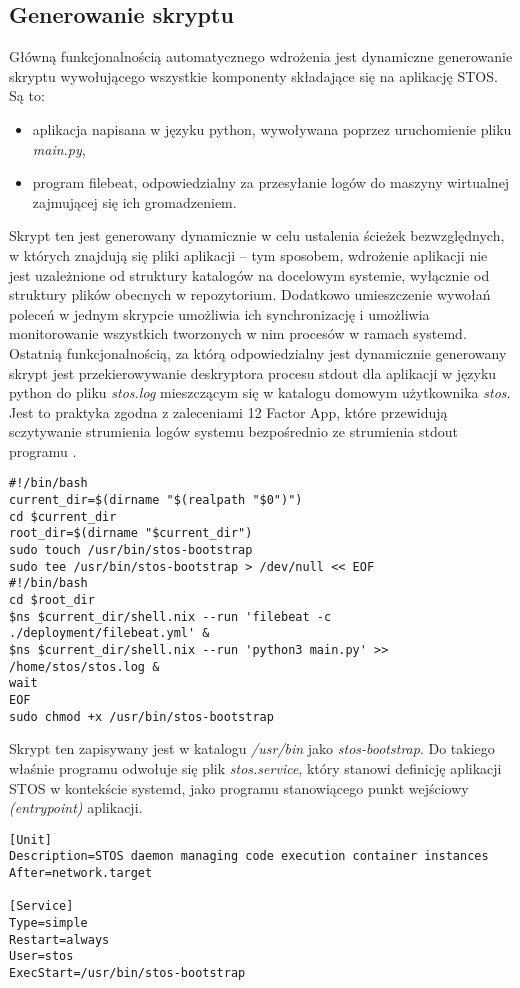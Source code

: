 \subsection{Generowanie skryptu}
Główną funkcjonalnością automatycznego wdrożenia jest dynamiczne generowanie skryptu wywołującego wszystkie komponenty składające się na aplikację STOS. Są to:
\begin{itemize}
	\item aplikacja napisana w języku python, wywoływana poprzez uruchomienie pliku \textit{main.py},
	\item program filebeat, odpowiedzialny za przesyłanie logów do maszyny wirtualnej zajmującej się ich gromadzeniem.
\end{itemize}
Skrypt ten jest generowany dynamicznie w celu ustalenia ścieżek bezwzględnych, w których znajdują się pliki aplikacji -- tym sposobem, wdrożenie aplikacji nie jest uzależnione od struktury katalogów na docelowym systemie, wyłącznie od struktury plików obecnych w repozytorium. Dodatkowo umieszczenie wywołań poleceń w jednym skrypcie umożliwia ich synchronizację i umożliwia monitorowanie wszystkich tworzonych w nim procesów w ramach systemd. Ostatnią funkcjonalnością, za którą odpowiedzialny jest dynamicznie generowany skrypt jest przekierowywanie deskryptora procesu stdout dla aplikacji w języku python do pliku \textit{stos.log} mieszczącym się w katalogu domowym użytkownika \textit{stos}. Jest to praktyka zgodna z zaleceniami 12 Factor App, które przewidują sczytywanie strumienia logów systemu bezpośrednio ze strumienia stdout programu \cite{12fa}.
\lstset{style=shell}
\begin{lstlisting}[caption = {Dynamiczne generowanie skryptu uruchamiającego aplikację STOS, uwzględniającego ścieżki bezwzlędne, w których znajdują się pliki źródłowe aplikacji}]
#!/bin/bash
current_dir=$(dirname "$(realpath "$0")")
cd $current_dir
root_dir=$(dirname "$current_dir")
sudo touch /usr/bin/stos-bootstrap
sudo tee /usr/bin/stos-bootstrap > /dev/null << EOF
#!/bin/bash
cd $root_dir
$ns $current_dir/shell.nix --run 'filebeat -c ./deployment/filebeat.yml' &
$ns $current_dir/shell.nix --run 'python3 main.py' >> /home/stos/stos.log &
wait
EOF
sudo chmod +x /usr/bin/stos-bootstrap
\end{lstlisting}
Skrypt ten zapisywany jest w katalogu \textit{/usr/bin} jako \textit{stos-bootstrap}. Do takiego właśnie programu odwołuje się plik \textit{stos.service}, który stanowi definicję aplikacji STOS w kontekście systemd, jako programu stanowiącego punkt wejściowy \textit{(entrypoint)} aplikacji.
\begin{lstlisting}[caption = {Definicja aplikacji STOS jako serwisu w kontekście systemd}]
[Unit]
Description=STOS daemon managing code execution container instances
After=network.target

[Service]
Type=simple
Restart=always
User=stos
ExecStart=/usr/bin/stos-bootstrap
\end{lstlisting}

